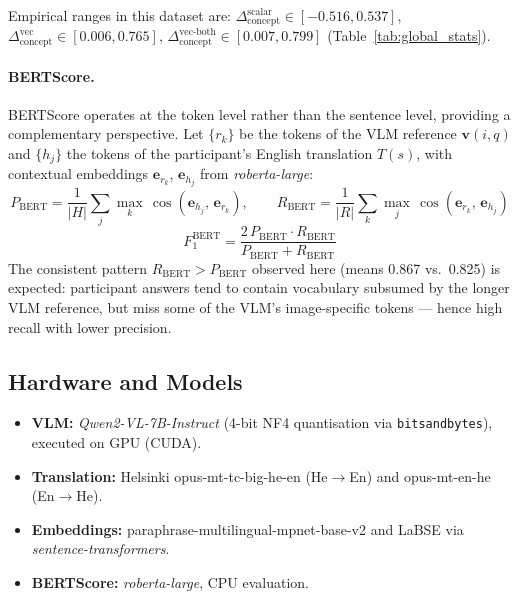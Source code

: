 \documentclass[12pt,a4paper]{article}
\newcommand{\SACs}{\ensuremath{\Delta_{\text{concept}}^{\text{scalar}}}}
\newcommand{\SACv}{\ensuremath{\Delta_{\text{concept}}^{\text{vec}}}}
\newcommand{\SACvb}{\ensuremath{\Delta_{\text{concept}}^{\text{vec-both}}}}
\newcommand{\bsF}{\ensuremath{F_1^{\text{BERT}}}}
\newcommand{\Qwen}{\textit{Qwen2-VL-7B-Instruct}}
\begin{document}
Empirical ranges in this dataset are:
$\SACs{}\in[-0.516, 0.537]$,
$\SACv{}\in[0.006, 0.765]$,
$\SACvb{}\in[0.007, 0.799]$
(Table~\ref{tab:global_stats}).

\paragraph{BERTScore.}
BERTScore \citep{bertscore2020} operates at the token level rather than the
sentence level, providing a complementary perspective.
Let $\{r_k\}$ be the tokens of the VLM reference $\mathbf{v}(i,q)$ and $\{h_j\}$
the tokens of the participant's English translation $T(s)$, with contextual embeddings
$\mathbf{e}_{r_k}$, $\mathbf{e}_{h_j}$ from \textit{roberta-large}:
\begin{equation}
  P_{\text{BERT}} = \frac{1}{|H|}\sum_{j}
    \max_{k}\,\cos(\mathbf{e}_{h_j},\, \mathbf{e}_{r_k}),
  \qquad
  R_{\text{BERT}} = \frac{1}{|R|}\sum_{k}
    \max_{j}\,\cos(\mathbf{e}_{r_k},\, \mathbf{e}_{h_j})
  \label{eq:bs_pr}
\end{equation}
\begin{equation}
  \bsF{}
    = \frac{2\,P_{\text{BERT}}\cdot R_{\text{BERT}}}
           {P_{\text{BERT}} + R_{\text{BERT}}}
  \label{eq:bertscore}
\end{equation}
The consistent pattern $R_{\text{BERT}} > P_{\text{BERT}}$ observed here (means 0.867
vs.\ 0.825) is expected: participant answers tend to contain vocabulary subsumed by the
longer VLM reference, but miss some of the VLM's image-specific tokens --- hence high
recall with lower precision.

\subsection{Hardware and Models}

\begin{itemize}[noitemsep]
  \item \textbf{VLM:} \Qwen{} (4-bit NF4 quantisation via \texttt{bitsandbytes}),
        executed on GPU (CUDA).
  \item \textbf{Translation:} Helsinki opus-mt-tc-big-he-en (He$\to$En) and
        opus-mt-en-he (En$\to$He).
  \item \textbf{Embeddings:} paraphrase-multilingual-mpnet-base-v2 and LaBSE via
        \textit{sentence-transformers}.
  \item \textbf{BERTScore:} \textit{roberta-large}, CPU evaluation.
\end{itemize}
\end{document}
